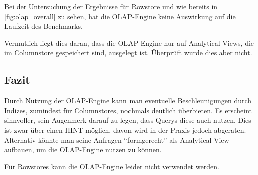 Bei der Untersuchung der Ergebnisse für Rowstore und wie bereits in \autoref{fig:olap_overall} zu sehen, hat die OLAP-Engine keine Auswirkung auf die Laufzeit des Benchmarks.

Vermutlich liegt dies daran, dass die OLAP-Engine nur auf Analytical-Views, die im Columnstore gespeichert sind, ausgelegt ist. Überprüft wurde dies aber nicht.



\subsection{Fazit}
Durch Nutzung der OLAP-Engine kann man eventuelle Beschleunigungen durch Indizes, zumindest für Columnstores, nochmals deutlich überbieten.
Es erscheint sinnvoller, sein Augenmerk darauf zu legen, dass Querys diese auch nutzen. Dies ist zwar über einen HINT möglich, davon wird in der Praxis jedoch abgeraten.\cite{olap4}
Alternativ könnte man seine Anfragen \enquote{formgerecht} als Analytical-View aufbauen, um die OLAP-Engine nutzen zu können.\cite{olap6,olap2}

Für Rowstores kann die OLAP-Engine leider nicht verwendet werden.
